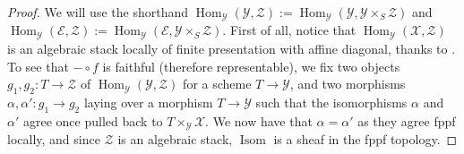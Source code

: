 \documentclass{amsart}
\newcommand{\cE}{\mathcal{E}}
\newcommand{\cX}{\mathcal{X}}
\newcommand{\cY}{\mathcal{Y}}
\newcommand{\cZ}{\mathcal{Z}}
\newcommand{\Hom}{\operatorname{Hom}}
\theoremstyle{definition}
\begin{document}
\begin{proof}We will use the shorthand $\Hom_{\cY}(\cY,\cZ) := \Hom_{\cY}(\cY,\cY\times_S\cZ) $ and $\Hom_{\cY}(\cE,\cZ) := \Hom_{\cY}(\cE,\cY\times_S\cZ) $.
    First of all, notice that $\Hom_{\cY}(\cX,\cZ)$ is an algebraic stack locally of finite presentation with affine diagonal, thanks to \cite[Thm. 1.2]{HR19}. To see that $- \circ f$ is faithful (therefore representable), we fix two objects $g_1,g_2:T\rightarrow \cZ$ of $\Hom_{\cY}(\cY,\cZ)$ for a scheme $T\to \cY$, and two morphisms $\alpha,\alpha':g_1 \rightarrow g_2$ laying over a morphism $T\rightarrow \cY$ such that the isomorphisms $\alpha$ and $\alpha'$ agree once pulled back to $T\times_\cY\cX$.  We now have that $\alpha=\alpha'$ as they agree fppf locally, and since $\cZ$ is an algebraic stack, $\operatorname{Isom}$ is a sheaf in the fppf topology.



\end{proof}
\end{document}
